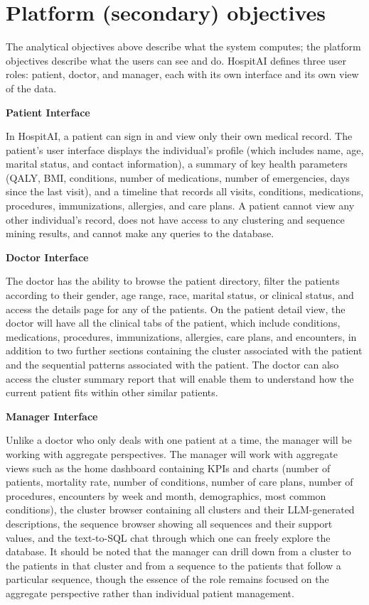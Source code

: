 \section{Platform (secondary) objectives}

The analytical objectives above describe what the system computes; the platform objectives describe what the users can see and do. HospitAI defines three user roles: patient, doctor, and manager, each with its own interface and its own view of the data.

\vspace{0.5em}
\noindent\textbf{Patient Interface}

In HospitAI, a patient can sign in and view only their own medical record. The patient's user interface displays the individual's profile (which includes name, age, marital status, and contact information), a summary of key health parameters (QALY, BMI, conditions, number of medications, number of emergencies, days since the last visit), and a timeline that records all visits, conditions, medications, procedures, immunizations, allergies, and care plans. A patient cannot view any other individual's record, does not have access to any clustering and sequence mining results, and cannot make any queries to the database.

\vspace{0.5em}
\noindent\textbf{Doctor Interface}

The doctor has the ability to browse the patient directory, filter the patients according to their gender, age range, race, marital status, or clinical status, and access the details page for any of the patients. On the patient detail view, the doctor will have all the clinical tabs of the patient, which include conditions, medications, procedures, immunizations, allergies, care plans, and encounters, in addition to two further sections containing the cluster associated with the patient and the sequential patterns associated with the patient. The doctor can also access the cluster summary report that will enable them to understand how the current patient fits within other similar patients.

\vspace{0.5em}
\noindent\textbf{Manager Interface}

Unlike a doctor who only deals with one patient at a time, the manager will be working with aggregate perspectives. The manager will work with aggregate views such as the home dashboard containing KPIs and charts (number of patients, mortality rate, number of conditions, number of care plans, number of procedures, encounters by week and month, demographics, most common conditions), the cluster browser containing all clusters and their LLM-generated descriptions, the sequence browser showing all sequences and their support values, and the text-to-SQL chat through which one can freely explore the database. It should be noted that the manager can drill down from a cluster to the patients in that cluster and from a sequence to the patients that follow a particular sequence, though the essence of the role remains focused on the aggregate perspective rather than individual patient management.

